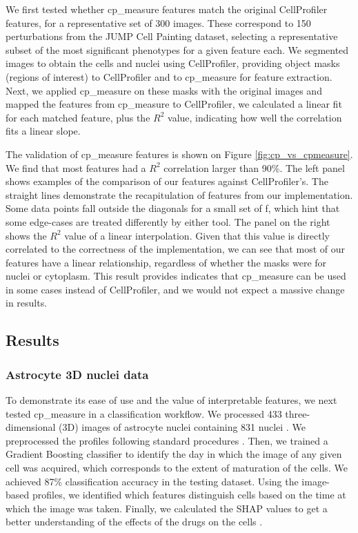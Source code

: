 \documentclass{article}
\begin{document}
We first tested whether cp\_measure features match the original CellProfiler features, for a representative set of 300 images. These correspond to 150 perturbations from the JUMP Cell Painting dataset\citep{chandrasekaranJUMPCellPainting2023}, selecting a representative subset of the most significant phenotypes for a given feature each. We segmented images to obtain the cells and nuclei using CellProfiler, providing object masks (regions of interest) to CellProfiler and to cp\_measure for feature extraction. Next, we applied cp\_measure on these masks with the original images and mapped the features from cp\_measure to CellProfiler, we calculated a linear fit for each matched feature, plus the \(R^2\) value, indicating how well the correlation fits a linear slope.

The validation of cp\_measure features is shown on Figure \ref{fig:cp_vs_cpmeasure}. We find that most features had a $R^2$ correlation larger than 90\%. The left panel shows examples of the comparison of our features against CellProfiler's. The straight lines demonstrate the recapitulation of features from our implementation. Some data points fall outside the diagonals for a small set of f, which hint that some edge-cases are treated differently by either tool. The panel on the right shows the \(R^2\) value of a linear interpolation. Given that this value is directly correlated to the correctness of the implementation, we can see that most of our features have a linear relationship, regardless of whether the masks were for nuclei or cytoplasm. This result provides indicates that cp\_measure can be used in some cases instead of CellProfiler, and we would not expect a massive change in results.
\subsection{Results}
\label{sec:orge5b5c6b}
\subsubsection{Astrocyte 3D nuclei data}
\label{sec:org447090b}

To demonstrate its ease of use and the value of interpretable features, we next tested cp\_measure in a classification workflow. We processed 433 three-dimensional (3D) images of astrocyte nuclei containing 831 nuclei \citep{kalinin3DCellNuclear2018}. We preprocessed the profiles following standard procedures \citep{caicedoDataanalysisStrategiesImagebased2017}. Then, we trained a Gradient Boosting classifier to identify the day in which the image of any given cell was acquired, which corresponds to the extent of maturation of the cells. We achieved 87\% classification accuracy in the testing dataset. Using the image-based profiles, we identified which features distinguish cells based on the time at which the image was taken. Finally, we calculated the SHAP values to get a better understanding of the effects of the drugs on the cells \citep{sundararajanManyShapleyValues2020}.
\end{document}
